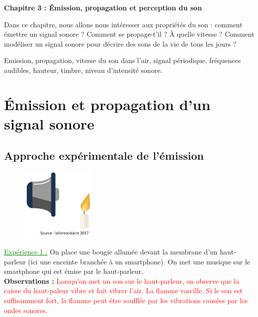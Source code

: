 \modeCorrection

\renewcommand{\thesubsection}{\textcolor{red}{\Roman{section}.\arabic{subsection}}}
\renewcommand{\thesubsubsection}{\textcolor{red}{\Roman{section}.\arabic{subsection}.\alph{subsubsection}}}

\setcounter{section}{0}
\sndEnTeteCoursTrois

\begin{mdframed}[style=titr, leftmargin=60pt, rightmargin=60pt, innertopmargin=7pt, innerbottommargin=7pt, innerrightmargin=8pt, innerleftmargin=8pt]

\begin{center}
\large{\textbf{Chapitre 3 : \'{E}mission, propagation et perception du son}}
\end{center}
\end{mdframed}
Dans ce chapitre, nous allons nous intéresser aux propriétés du son : comment émettre un signal sonore ? Comment se propage-t'il ? \`{A} quelle vitesse ? Comment modéliser un signal sonore pour décrire des sons de la vie de tous les jours ?

\begin{tcolorbox}[colback=blue!5!white,colframe=blue!75!black,title=Mots clés du chapitre :]
Emission, propagation, vitesse du son dans l'air, signal périodique, fréquences audibles, hauteur, timbre, niveau d'intensité sonore.
\end{tcolorbox}


\section{\'{E}mission et propagation d'un signal sonore}
\subsection{Approche expérimentale de l'émission}
\begin{figure}
\vspace{-0cm}
    \centering
     \includegraphics[width=0.32\textwidth]{Images/Haut_parleur_bougie.PNG}
   \end{figure}
\textcolor{green}{\underline{Expérience 1 :}} On place une bougie allumée devant la membrane d'un haut-parleur (ici une enceinte branchée à un smartphone). On met une musique sur le smartphone qui est émise par le haut-parleur.\\
\textbf{Observations :} \textcolor{red}{Lorsqu'on met un son sur le haut-parleur, on observe que la caisse du haut-paleur vibre et fait vibrer l'air. La flamme vascille. Si le son est suffisamment fort, la flamme peut être soufflée par les vibrations causées par les ondes sonores.}


